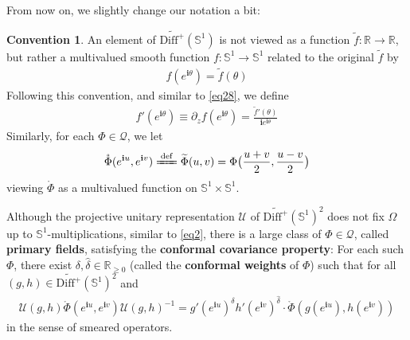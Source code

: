 \documentclass[12pt,b5paper,notitlepage]{article}
\theoremstyle{definition}
\newtheorem{cv}[df]{Convention}
\theoremstyle{plain}
\newcommand{\mc}{\mathcal}
\newcommand{\wtd}{\widetilde}
\newcommand{\wht}{\widehat}
\newcommand{\im}{\mathbf{i}}
\newcommand{\Rbb}{\mathbb R}
\newcommand{\Sbb}{{\mathbb S}}
\newcommand{\WDS}{\widetilde{\mathrm{Diff}^+}(\mathbb S^1)}
\numberwithin{equation}{section}
\begin{document}
\subsection{}


From now on, we slightly change our notation a bit: 
\begin{cv}
An element of $\WDS$ is not viewed as a function $\wtd f:\Rbb\rightarrow\Rbb$, but rather a multivalued smooth function $f:\Sbb^1\rightarrow\Sbb^1$ related to the original $\wtd f$ by
\begin{align*}
f(e^{\im\theta})=\wtd f(\theta)
\end{align*}
Following this convention, and similar to \eqref{eq28}, we define
\begin{align}
f'(e^{\im\theta})\equiv\partial_z f(e^{\im\theta})=\frac{\wtd f'(\theta)}{\im e^{\im\theta}}
\end{align}
Similarly, for each $\Phi\in\mc Q$, we let
\begin{align}
\mathring{\Phi}(e^{\im u},e^{\im v})\xlongequal{\mathrm{def}}\wtd\Phi(u,v)=\Phi\big(\frac{u+v}2,\frac{u-v}2\big)
\end{align}
viewing $\mathring\Phi$ as a multivalued function on $\Sbb^1\times\Sbb^1$.
\end{cv}




Although the projective unitary representation $\mc U$ of $\WDS^2$ does not fix $\Omega$ up to $\Sbb^1$-multiplications, similar to \eqref{eq2}, there is a large class of $\Phi\in\mc Q$, called \textbf{primary fields}, satisfying the \textbf{conformal covariance property}: For each such $\Phi$, there exist $\delta,\wht\delta\in \Rbb_{\geq0}$ (called the \textbf{conformal weights}  of $\Phi$) such that for all $(g,h)\in\WDS^2$ and 
\begin{align}\label{eq30}
\mc U(g,h)\mathring\Phi(e^{\im u},e^{\im v})\mc U(g,h)^{-1}=g'(e^{\im u})^\delta h'(e^{\im v})^{\wht\delta}\cdot\mathring\Phi(g(e^{\im u}),h(e^{\im v}))
\end{align}
in the sense of smeared operators.


\subsection{}
\end{document}
